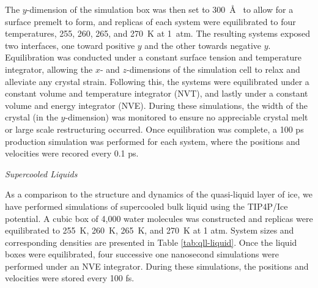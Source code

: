 The $y$-dimension of the simulation box was then set to 300~\AA~ to
allow for a surface premelt to form, and replicas of each system were
equilibrated to four temperatures, 255, 260, 265, and 270~K at
1~atm. The resulting systems exposed two interfaces, one toward
positive $y$ and the other towards negative $y$. Equilibration was
conducted under a constant surface tension and temperature integrator,
allowing the $x$- and $z$-dimensions of the simulation cell to relax
and alleviate any crystal strain. Following this, the systems were
equilibrated under a constant volume and temperature integrator (NVT),
and lastly under a constant volume and energy integrator (NVE). During
these simulations, the width of the crystal (in the $y$-dimension) was
monitored to ensure no appreciable crystal melt or large scale
restructuring occurred. Once equilibration was complete, a 100 ps
production simulation was performed for each system, where the
positions and velocities were recored every 0.1 ps.





\begin{flushleft}
\textit{Supercooled Liquids}
\end{flushleft}
As a comparison to the structure and dynamics of the quasi-liquid
layer of ice, we have performed simulations of supercooled bulk liquid using the
TIP4P/Ice potential. A cubic box of 4,000 water molecules was
constructed and replicas were equilibrated to 255~K, 260~K, 265~K, and
270~K at 1 atm. System sizes and corresponding densities are presented in Table
\ref{tab:qll-liquid}. Once the liquid boxes were equilibrated, four
successive one nanosecond simulations were performed under an NVE
integrator. During these simulations, the positions and velocities
were stored every 100 fs.

